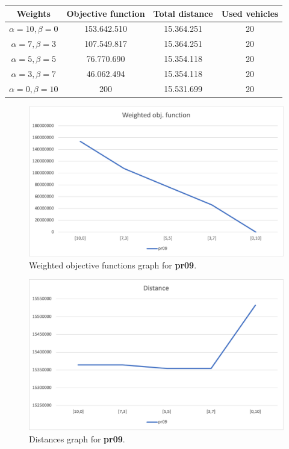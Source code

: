 {
\renewcommand{\arraystretch}{2}
\begin{longtable}[h]{| c | c | c | c |}
    \hline
    \textbf{Weights} & \textbf{Objective function} & \textbf{Total distance} & \textbf{Used vehicles} \\
    \hline
    \endhead
    $\alpha = 10, \beta = 0$ & 153.642.510 & 15.364.251 & 20 \\
    \hline
    $\alpha = 7, \beta = 3$  & 107.549.817 & 15.364.251 & 20 \\
    \hline
    $\alpha = 5, \beta = 5$  &  76.770.690 & 15.354.118 & 20 \\
    \hline
    $\alpha = 3, \beta = 7$  &  46.062.494 & 15.354.118 & 20 \\
    \hline
    $\alpha = 0, \beta = 10$ &         200 & 15.531.699 & 20 \\
    \hline
\end{longtable}
}
\begin{figure}[H]
    \centering
    \includegraphics[height=0.25\textheight]{../graphs/pr09-wobjf.png}
    \caption{Weighted objective functions graph for \textbf{pr09}.}
\end{figure}

\begin{figure}[H]
    \centering
    \includegraphics[height=0.25\textheight]{../graphs/pr09-distance.png}
    \caption{Distances graph for \textbf{pr09}.}
\end{figure}

